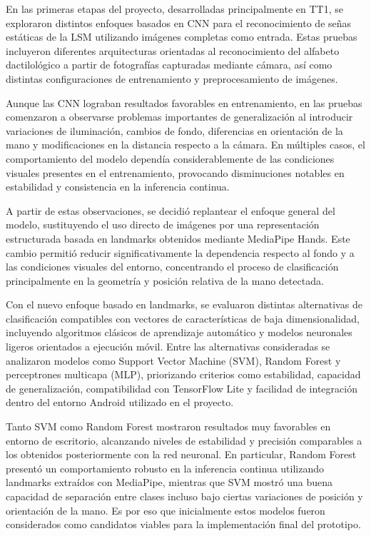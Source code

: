 	En las primeras etapas del proyecto, desarrolladas principalmente en TT1, se exploraron distintos enfoques basados en CNN para el reconocimiento de señas estáticas de la LSM utilizando imágenes completas como entrada. Estas pruebas incluyeron diferentes arquitecturas orientadas al reconocimiento del alfabeto dactilológico a partir de fotografías capturadas mediante cámara, así como distintas configuraciones de entrenamiento y preprocesamiento de imágenes.
	
	Aunque las CNN lograban resultados favorables en entrenamiento, en las pruebas comenzaron a observarse problemas importantes de generalización al introducir variaciones de iluminación, cambios de fondo, diferencias en orientación de la mano y modificaciones en la distancia respecto a la cámara. En múltiples casos, el comportamiento del modelo dependía considerablemente de las condiciones visuales presentes en el entrenamiento, provocando disminuciones notables en estabilidad y consistencia en la inferencia continua.
	
	A partir de estas observaciones, se decidió replantear el enfoque general del modelo, sustituyendo el uso directo de imágenes por una representación estructurada basada en landmarks obtenidos mediante MediaPipe Hands. Este cambio permitió reducir significativamente la dependencia respecto al fondo y a las condiciones visuales del entorno, concentrando el proceso de clasificación principalmente en la geometría y posición relativa de la mano detectada.
	
	Con el nuevo enfoque basado en landmarks, se evaluaron distintas alternativas de clasificación compatibles con vectores de características de baja dimensionalidad, incluyendo algoritmos clásicos de aprendizaje automático y modelos neuronales ligeros orientados a ejecución móvil. Entre las alternativas consideradas se analizaron modelos como Support Vector Machine (SVM), Random Forest y perceptrones multicapa (MLP), priorizando criterios como estabilidad, capacidad de generalización, compatibilidad con TensorFlow Lite y facilidad de integración dentro del entorno Android utilizado en el proyecto.
	
	Tanto SVM como Random Forest mostraron resultados muy favorables en entorno de escritorio, alcanzando niveles de estabilidad y precisión comparables a los obtenidos posteriormente con la red neuronal. En particular, Random Forest presentó un comportamiento robusto en la inferencia continua utilizando landmarks extraídos con MediaPipe, mientras que SVM mostró una buena capacidad de separación entre clases incluso bajo ciertas variaciones de posición y orientación de la mano. Es por eso que inicialmente estos modelos fueron considerados como candidatos viables para la implementación final del prototipo.
	
